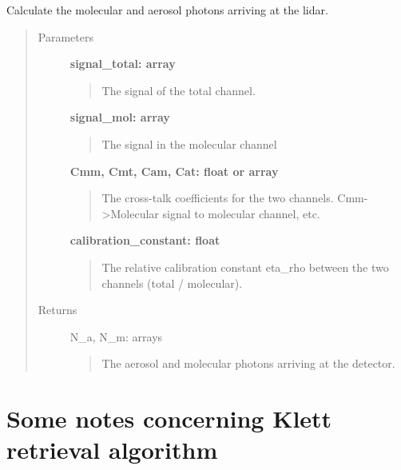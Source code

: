 \documentclass[letterpaper,10pt,english]{sphinxmanual}
\begin{document}
\begin{fulllineitems}
\label{hsrl_retrieval:hsrl_retrieval.signal_unmixing}
Calculate the molecular and aerosol photons arriving at the lidar.
\begin{quote}\begin{description}
\item[{Parameters}] \leavevmode
\textbf{signal\_total: array}
\begin{quote}

The signal of the total channel.
\end{quote}

\textbf{signal\_mol: array}
\begin{quote}

The signal in the molecular channel
\end{quote}

\textbf{Cmm, Cmt, Cam, Cat: float or array}
\begin{quote}

The cross-talk coefficients for the two channels. Cmm-\textgreater{}Molecular signal to molecular channel, etc.
\end{quote}

\textbf{calibration\_constant: float}
\begin{quote}

The relative calibration constant eta\_rho between the two channels (total / molecular).
\end{quote}

\item[{Returns}] \leavevmode
N\_a, N\_m: arrays
\begin{quote}

The aerosol and molecular photons arriving at the detector.
\end{quote}

\end{description}\end{quote}

\end{fulllineitems}



\chapter{Some notes concerning Klett retrieval algorithm}
\label{klett_notes:some-notes-concerning-klett-retrieval-algorithm}\label{klett_notes::doc}
\end{document}
